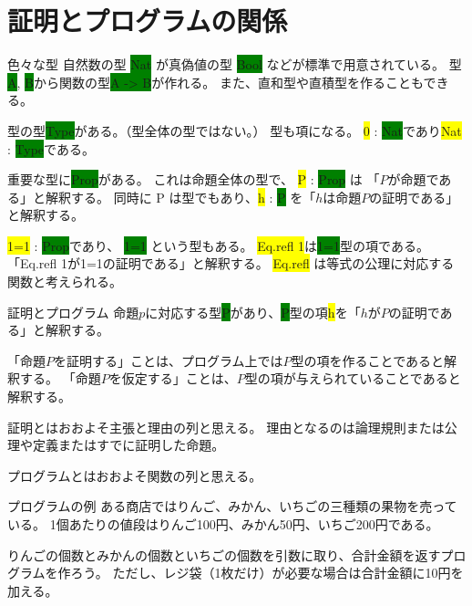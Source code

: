 \documentclass[unicode,12pt]{beamer}%
\newcommand{\type}[1]{\colorbox{green}{#1}}
\newcommand{\term}[1]{\colorbox{yellow}{#1}}
\begin{document}
\section{証明とプログラムの関係}

\begin{frame}{色々な型}
  自然数の型 \type{Nat} が真偽値の型 \type{Bool} などが標準で用意されている。
  型\type{A}, \type{B}から関数の型\type{A -> B}が作れる。
  また、直和型や直積型を作ることもできる。

  \pause

  型の型\type{Type}がある。（型全体の型ではない。）
  型も項になる。
  \term{0} : \type{Nat}であり\term{Nat} : \type{Type}である。

  \pause

  重要な型に\type{Prop}がある。
  これは命題全体の型で、 \term{P} : \type{Prop} は 「$P$が命題である」と解釈する。
  同時に P は型でもあり、\term{h} : \type{P} を「$h$は命題$P$の証明である」と解釈する。

  \pause

  \term{1=1} : \type{Prop}であり、
  \type{1=1} という型もある。
  \term{Eq.refl 1}は\type{1=1}型の項である。
  「Eq.refl 1が1=1の証明である」と解釈する。
  \term{Eq.refl} は等式の公理に対応する関数と考えられる。
\end{frame}

\begin{frame}{証明とプログラム}
  命題$p$に対応する型\type{P}があり、\type{P}型の項\term{h}を「$h$が$P$の証明である」と解釈する。

  「命題$P$を証明する」ことは、プログラム上では$P$型の項を作ることであると解釈する。
  「命題$P$を仮定する」ことは、$P$型の項が与えられていることであると解釈する。

  \pause

  証明とはおおよそ主張と理由の列と思える。
  理由となるのは論理規則または公理や定義またはすでに証明した命題。

  プログラムとはおおよそ関数の列と思える。
\end{frame}

\begin{frame}{プログラムの例}
  ある商店ではりんご、みかん、いちごの三種類の果物を売っている。
  1個あたりの値段はりんご100円、みかん50円、いちご200円である。

  りんごの個数とみかんの個数といちごの個数を引数に取り、合計金額を返すプログラムを作ろう。
  ただし、レジ袋（1枚だけ）が必要な場合は合計金額に10円を加える。
\end{frame}
\end{document}
